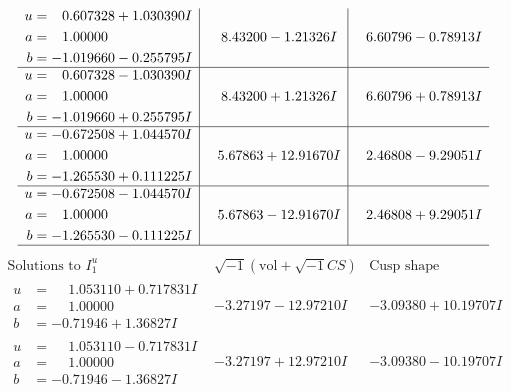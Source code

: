 \documentclass[1p]{elsarticle_modified}
\theoremstyle{definition}
\newcommand{\I}{\sqrt{-1}}
\begin{document}
$$\begin{array}{c|c|c}
\begin{aligned}
u &= \phantom{-}0.607328 + 1.030390 I \\
a &= \phantom{-}1.00000\phantom{ +0.000000I} \\
b &= -1.019660 - 0.255795 I\end{aligned}
 & \phantom{-}8.43200 - 1.21326 I & \phantom{-}6.60796 - 0.78913 I \\ \hline\begin{aligned}
u &= \phantom{-}0.607328 - 1.030390 I \\
a &= \phantom{-}1.00000\phantom{ +0.000000I} \\
b &= -1.019660 + 0.255795 I\end{aligned}
 & \phantom{-}8.43200 + 1.21326 I & \phantom{-}6.60796 + 0.78913 I \\ \hline\begin{aligned}
u &= -0.672508 + 1.044570 I \\
a &= \phantom{-}1.00000\phantom{ +0.000000I} \\
b &= -1.265530 + 0.111225 I\end{aligned}
 & \phantom{-}5.67863 + 12.91670 I & \phantom{-}2.46808 - 9.29051 I \\ \hline\begin{aligned}
u &= -0.672508 - 1.044570 I \\
a &= \phantom{-}1.00000\phantom{ +0.000000I} \\
b &= -1.265530 - 0.111225 I\end{aligned}
 & \phantom{-}5.67863 - 12.91670 I & \phantom{-}2.46808 + 9.29051 I\\
 \hline 
 \end{array}$$\newpage$$\begin{array}{c|c|c}  
\text{Solutions to }I^u_{1}& \I (\text{vol} + \sqrt{-1}CS) & \text{Cusp shape}\\
 \hline 
\begin{aligned}
u &= \phantom{-}1.053110 + 0.717831 I \\
a &= \phantom{-}1.00000\phantom{ +0.000000I} \\
b &= -0.71946 + 1.36827 I\end{aligned}
 & -3.27197 - 12.97210 I & -3.09380 + 10.19707 I \\ \hline\begin{aligned}
u &= \phantom{-}1.053110 - 0.717831 I \\
a &= \phantom{-}1.00000\phantom{ +0.000000I} \\
b &= -0.71946 - 1.36827 I\end{aligned}
 & -3.27197 + 12.97210 I & -3.09380 - 10.19707 I \\ \hline\begin{aligned}

\end{aligned}
\end{array}$$
\end{document}

